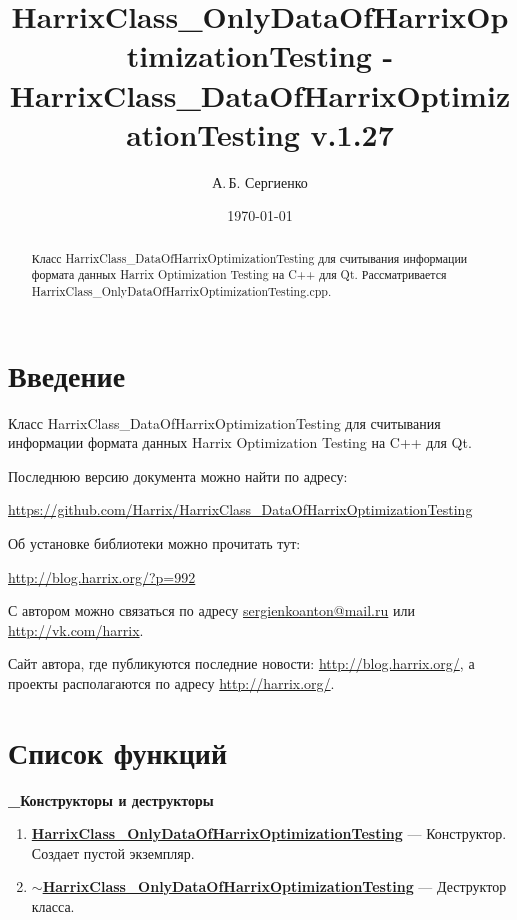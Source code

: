 \documentclass[a4paper,12pt]{article}
\title{Har\-rix\-Class\_On\-ly\-Da\-ta\-Of\-Har\-rix\-Op\-ti\-mi\-za\-tion\-Test\-ing - Har\-rix\-Class\_Da\-ta\-Of\-Har\-rix\-Op\-ti\-mi\-za\-ti\-on\-Tes\-ting v.1.27}
\author{А.\,Б. Сергиенко}
\date{\today}
\begin{document}


\maketitle

\begin{abstract}
Класс HarrixClass\_DataOfHarrixOptimizationTesting для считывания информации формата данных Harrix Optimization Testing на C++ для Qt. Рассматривается HarrixClass\_OnlyDataOfHarrixOptimizationTesting.cpp.
\end{abstract}

\tableofcontents

\newpage

\section{Введение}

Класс HarrixClass\_DataOfHarrixOptimizationTesting для считывания информации формата данных Harrix Optimization Testing на C++ для Qt.

Последнюю версию документа можно найти по адресу:

\href{https://github.com/Harrix/HarrixClass\_DataOfHarrixOptimizationTesting}{https://github.com/Harrix/HarrixClass\_DataOfHarrixOptimizationTesting}

Об установке библиотеки можно прочитать тут:

\href{http://blog.harrix.org/?p=992}{http://blog.harrix.org/?p=992}

С автором можно связаться по адресу \href{mailto:sergienkoanton@mail.ru}{sergienkoanton@mail.ru} или  \href{http://vk.com/harrix}{http://vk.com/harrix}.

Сайт автора, где публикуются последние новости: \href{http://blog.harrix.org/}{http://blog.harrix.org/}, а проекты располагаются по адресу \href{http://harrix.org/}{http://harrix.org/}.

\newpage
\section{Список функций}\label{section_listfunctions}
\textbf{\_Конструкторы и деструкторы}
\begin{enumerate}
	
	\item \textbf{\hyperref[HarrixClass_OnlyDataOfHarrixOptimizationTesting]{HarrixClass\_OnlyDataOfHarrixOptimizationTesting}} --- Конструктор. Создает пустой экземпляр.
	
	\item \textbf{\hyperref[tildaHarrixClass_OnlyDataOfHarrixOptimizationTesting]{$\sim$HarrixClass\_OnlyDataOfHarrixOptimizationTesting}} --- Деструктор класса.
	
\end{enumerate}
\end{document}
